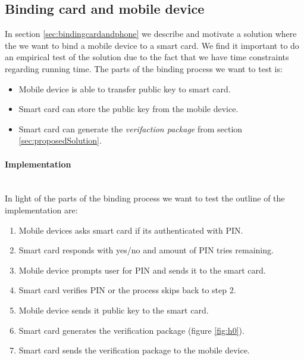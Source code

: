 \subsection{Binding card and mobile device}
In section \ref{sec:bindingcardandphone} we describe and motivate a solution where the we want to bind a mobile device to a smart card. We find it important to do an empirical test of the solution due to the fact that we have time constraints regarding running time. The parts of the binding process we want to test is:

\begin{itemize}
    \item Mobile device is able to transfer public key to smart card.
    \item Smart card can store the public key from the mobile device.
    \item Smart card can generate the \textit{verifaction package} from section \ref{sec:proposedSolution}.
\end{itemize}

\paragraph{Implementation}\mbox{}\\
In light of the parts of the binding process we want to test the outline of the implementation are:

\begin{enumerate}
    \item Mobile devices asks smart card if its authenticated with PIN.
    \item Smart card responds with yes/no and amount of PIN tries remaining.
    \item Mobile device prompts user for PIN and sends it to the smart card.
    \item Smart card verifies PIN or the process skips back to step 2.
    \item Mobile device sends it public key to the smart card.
    \item Smart card generates the verification package (figure \ref{fig:h0}).
    \item Smart card sends the verification package to the mobile device.
\end{enumerate}

